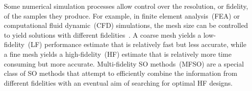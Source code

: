 

Some numerical simulation processes allow control over the resolution, or fidelity, of the samples they produce. For example, in finite element analysis~(FEA) or computational fluid dynamic~(CFD) simulations, the mesh size can be controlled to yield solutions with different fidelities~\cite{branke2016efficient,toal2015some}. A coarse mesh yields a low-fidelity~(LF) performance estimate that is relatively fast but less accurate, while a fine mesh yields a high-fidelity~(HF) estimate that is relatively more time consuming but more accurate. Multi-fidelity SO methods~(MFSO) are a special class of SO methods that attempt to efficiently combine the information from different fidelities with an eventual aim of searching for optimal HF designs. 

% 



